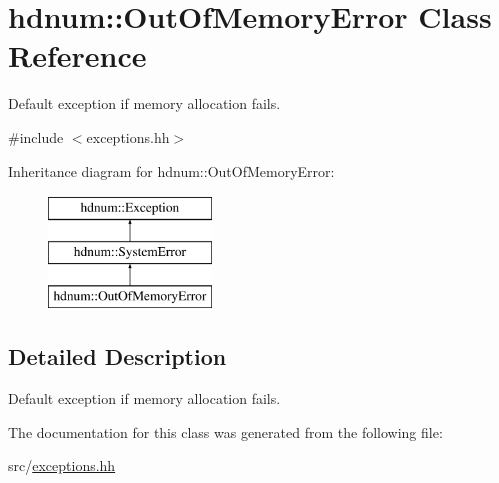 \hypertarget{classhdnum_1_1OutOfMemoryError}{
\section{hdnum::OutOfMemoryError Class Reference}
\label{classhdnum_1_1OutOfMemoryError}
}


Default exception if memory allocation fails.  




{\ttfamily \#include $<$exceptions.hh$>$}

Inheritance diagram for hdnum::OutOfMemoryError:\begin{figure}[H]
\begin{center}
\leavevmode
\includegraphics[height=3cm]{classhdnum_1_1OutOfMemoryError}
\end{center}
\end{figure}


\subsection{Detailed Description}
Default exception if memory allocation fails. 

The documentation for this class was generated from the following file:\begin{DoxyCompactItemize}
\item 
src/\hyperlink{exceptions_8hh}{exceptions.hh}\end{DoxyCompactItemize}
